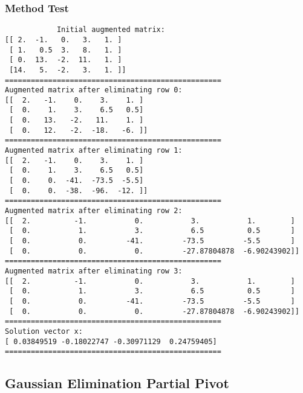 \documentclass{article}
\begin{document}
        \subsubsection{Method Test}
        \begin{lstlisting}
            Initial augmented matrix:
[[ 2.  -1.   0.   3.   1. ]
 [ 1.   0.5  3.   8.   1. ]
 [ 0.  13.  -2.  11.   1. ]
 [14.   5.  -2.   3.   1. ]]
==================================================
Augmented matrix after eliminating row 0:
[[  2.   -1.    0.    3.    1. ]
 [  0.    1.    3.    6.5   0.5]
 [  0.   13.   -2.   11.    1. ]
 [  0.   12.   -2.  -18.   -6. ]]
==================================================
Augmented matrix after eliminating row 1:
[[  2.   -1.    0.    3.    1. ]
 [  0.    1.    3.    6.5   0.5]
 [  0.    0.  -41.  -73.5  -5.5]
 [  0.    0.  -38.  -96.  -12. ]]
==================================================
Augmented matrix after eliminating row 2:
[[  2.          -1.           0.           3.           1.        ]
 [  0.           1.           3.           6.5          0.5       ]
 [  0.           0.         -41.         -73.5         -5.5       ]
 [  0.           0.           0.         -27.87804878  -6.90243902]]
==================================================
Augmented matrix after eliminating row 3:
[[  2.          -1.           0.           3.           1.        ]
 [  0.           1.           3.           6.5          0.5       ]
 [  0.           0.         -41.         -73.5         -5.5       ]
 [  0.           0.           0.         -27.87804878  -6.90243902]]
==================================================
Solution vector x:
[ 0.03849519 -0.18022747 -0.30971129  0.24759405]
==================================================
\end{lstlisting}

    \subsection{Gaussian Elimination Partial Pivot}
\end{document}
